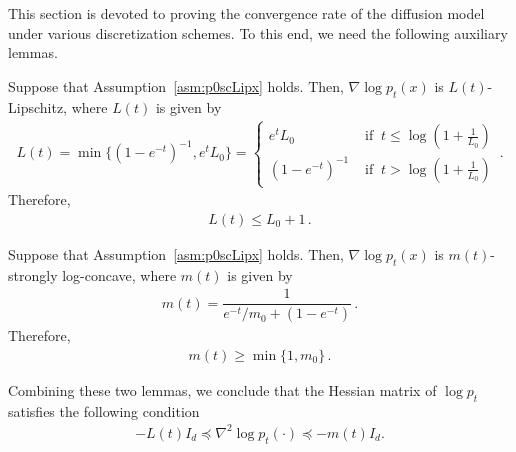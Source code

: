 This section is devoted to proving the convergence rate of the diffusion model under various discretization schemes. 
To this end, we need the following auxiliary lemmas.
\begin{lemma}{\label{lem:GaoLt}}
    Suppose that Assumption~\ref{asm:p0scLipx} holds. Then, $\nabla\log p_t(x)$ is $L(t)$-Lipschitz, where $L(t)$ is given by 
    \begin{align*}
        L(t)=\min\{(1-e^{-t})^{-1},e^tL_0\}=
        \begin{cases}e^tL_0 & \text{ if }~t\leqslant \log(1+\frac{1}{L_0})\\
        (1-e^{-t})^{-1} & \text{ if }~t>\log(1+\frac{1}{L_0})
        \end{cases}\,.
    \end{align*}  
    Therefore, 
    \begin{align*}
        L(t)\leqslant  L_0+1\,.
    \end{align*}
\end{lemma}
\begin{lemma}{\label{lem:Gaomt}}
    Suppose that Assumption~\ref{asm:p0scLipx} holds. Then, $\nabla\log p_t(x)$ is $m(t)$-strongly log-concave, where $m(t)$ is given by
    \begin{align*}
        m(t)=\dfrac{1}{e^{-t}/m_0+(1-e^{-t})}\,.
    \end{align*}
    Therefore, 
    \begin{align*}
        m(t)\geqslant \min\{1,m_0\}\,.
    \end{align*}
\end{lemma}
Combining these two lemmas, we conclude that the Hessian matrix of $\log p_t$ satisfies the following condition
\begin{align*}
    -L(t)I_d \preccurlyeq \nabla^2\log p_t(\cdot)\preccurlyeq -m(t)I_d.
\end{align*}


